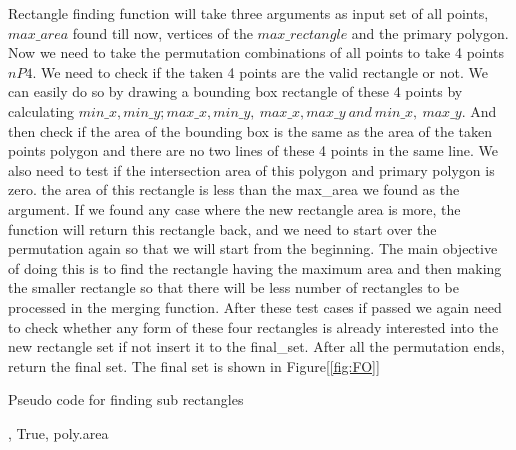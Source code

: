 \documentclass[a4paper,17pt]{article}
\begin{document}
Rectangle finding function will take three arguments as input set of all points, {$max\_area$} found till now, vertices of the {$max\_rectangle$} and the primary polygon. Now we need to take the permutation combinations of all points to take 4 points {$nP4$}. We need to check if the taken 4 points are the valid rectangle or not.  We can easily do so by drawing a bounding box rectangle of these 4 points by calculating {$min\_x, min\_y; max\_x, min\_y,\ max\_x,max\_y\ and\ min\_x,\ max\_y$}. And then check if the area of the bounding box is the same as the area of the taken points polygon and there are no two lines of these 4 points in the same line. We also need to test if the intersection area of this polygon and primary polygon is zero. the area of this rectangle is less than the max\_area we found as the argument. If we found any case where the new rectangle area is more, the function will return this rectangle back, and we need to start over the permutation again so that we will start from the beginning. The main objective of doing this is to find the rectangle having the maximum area and then making the smaller rectangle so that there will be less number of rectangles to be processed in the merging function. After these test cases if passed we again need to check whether any form of these four rectangles is already interested into the new rectangle set if not insert it to the final\_set. After all the permutation ends, return the final set. The final set is shown in Figure[\ref{fig:FO}]


\begin{algorithm}
    \caption{Pseudo code for finding sub rectangles}
    \label{alg:FSR}
    \begin{algorithmic}[1]
                \Else
                        \EndIf
                    \EndFor
                    \EndIf
                            \State \Return [poly], True, poly.area
                        \EndIf
                    \EndIf
                \EndIf
            \EndIf
        \EndFor
        \State {}
    \EndProcedure
    \end{algorithmic}
\end{algorithm}
\end{document}
